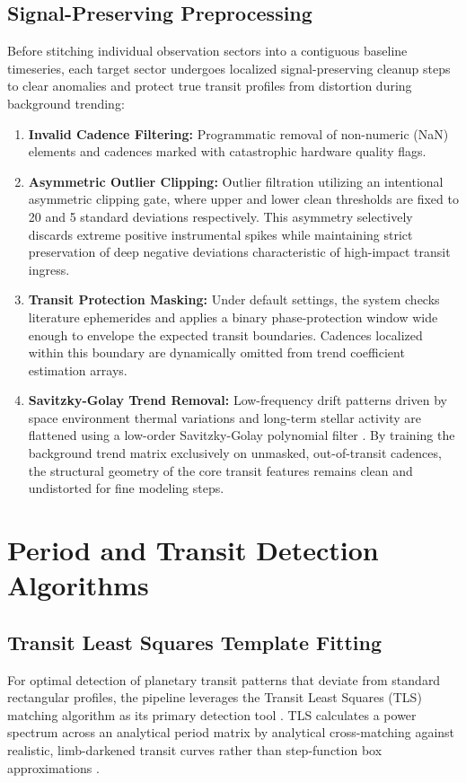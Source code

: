 \documentclass[12pt,a4paper,oneside]{report}
\begin{document}
\section{Signal-Preserving Preprocessing}
Before stitching individual observation sectors into a contiguous baseline timeseries, each target sector undergoes localized signal-preserving cleanup steps to clear anomalies and protect true transit profiles from distortion during background trending:
\begin{enumerate}
  \item \textbf{Invalid Cadence Filtering:} Programmatic removal of non-numeric (NaN) elements and cadences marked with catastrophic hardware quality flags.
  \item \textbf{Asymmetric Outlier Clipping:} Outlier filtration utilizing an intentional asymmetric clipping gate, where upper and lower clean thresholds are fixed to 20 and 5 standard deviations respectively. This asymmetry selectively discards extreme positive instrumental spikes while maintaining strict preservation of deep negative deviations characteristic of high-impact transit ingress.
  \item \textbf{Transit Protection Masking:} Under default settings, the system checks literature ephemerides and applies a binary phase-protection window wide enough to envelope the expected transit boundaries. Cadences localized within this boundary are dynamically omitted from trend coefficient estimation arrays.
  \item \textbf{Savitzky-Golay Trend Removal:} Low-frequency drift patterns driven by space environment thermal variations and long-term stellar activity are flattened using a low-order Savitzky-Golay polynomial filter \cite{tess_exoplanet_pipeline.zip:README.md}. By training the background trend matrix exclusively on unmasked, out-of-transit cadences, the structural geometry of the core transit features remains clean and undistorted for fine modeling steps.
\end{enumerate}

\chapter{Period and Transit Detection Algorithms}

\section{Transit Least Squares Template Fitting}
For optimal detection of planetary transit patterns that deviate from standard rectangular profiles, the pipeline leverages the Transit Least Squares (TLS) matching algorithm as its primary detection tool \cite{tess_exoplanet_pipeline.zip:README.md}. TLS calculates a power spectrum across an analytical period matrix by analytical cross-matching against realistic, limb-darkened transit curves rather than step-function box approximations \cite{hippke2019}. 
\end{document}
